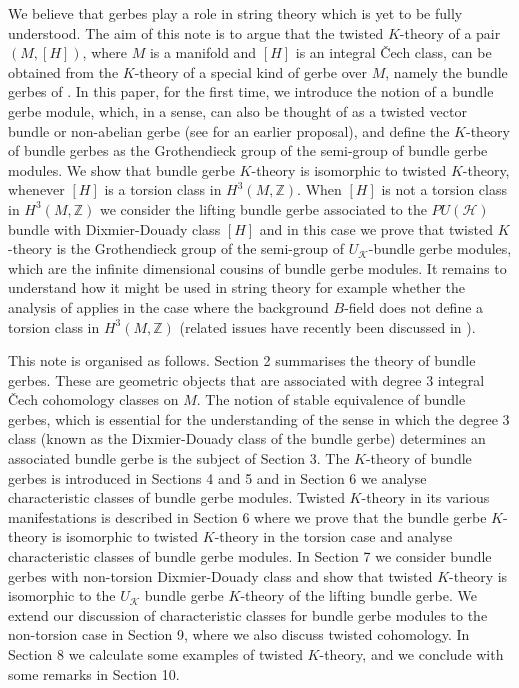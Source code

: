 \documentclass[a4paper,reqno]{amsart}
\theoremstyle{plain}
\theoremstyle{definition}
\theoremstyle{remark}
\numberwithin{equation}{section}
\numberwithin{figure}{section}
\newcommand{\cH}{{\mathcal H}}
\newcommand{\ZZ}{{\mathbb Z}}
\newcommand{\UK}{U{_\mathcal K}}
\newcommand{\<}{\langle}
\renewcommand{\>}{\rangle}
\begin{document}
We believe that gerbes play a role in string theory which is yet to be
fully understood. The aim of this note is to argue that the twisted
$K$-theory of a pair $(M,[H])$, where $M$ is a manifold and $[H]$ is
an integral \v Cech class, can be obtained from the
$K$-theory of a special kind of gerbe over $M$, namely the bundle
gerbes of \cite{Mur}.  In this paper, for the
first time, we introduce the notion of a bundle gerbe
module, which, in a sense, can also be thought of as a twisted
vector bundle or non-abelian gerbe (see \cite{Kalk} for an
earlier proposal), and define the $K$-theory of bundle gerbes as
the Grothendieck group of the semi-group of bundle gerbe modules.
We show that bundle gerbe $K$-theory is isomorphic
to twisted $K$-theory, whenever $[H]$ is a torsion class in $H^3(M,
\mathbb Z)$.
When $[H]$ is not a torsion class in $H^3(M, \mathbb Z)$ we consider the
lifting bundle gerbe associated to the $PU(\cH)$ bundle with Dixmier-Douady
class $[H]$ and in this case we prove
that twisted $K$-theory
is the Grothendieck group of the semi-group of  $\UK$-bundle gerbe modules,
which are the infinite dimensional cousins of bundle gerbe modules.
   It remains to understand how it might be used in string theory for
example whether the analysis of
\cite{FW} applies in the case where the background $B$-field does not
define a torsion class in
$H^3(M,\ZZ)$ (related issues have recently been discussed in 
\cite{MalMooSei}).

This note is organised as follows. Section 2 summarises the theory of
bundle gerbes. These are geometric objects that are associated with
degree 3 integral \v Cech cohomology classes on $M$. The notion of stable
equivalence of bundle gerbes, which is essential for the understanding
of the sense in which the degree 3 class (known as the Dixmier-Douady
class of the bundle gerbe) determines an associated bundle gerbe is
the subject of Section 3.  The $K$-theory of bundle gerbes is
introduced in Sections 4 and 5 and in Section 6 we analyse
characteristic classes of bundle gerbe modules.   
Twisted $K$-theory in its various
manifestations is described in Section 6 where we prove that the
bundle gerbe $K$-theory is isomorphic to twisted $K$-theory in the torsion
case and analyse characteristic classes of bundle gerbe modules.
In Section 7 we consider bundle gerbes with non-torsion
Dixmier-Douady class  and show that twisted $K$-theory  is isomorphic
to the  $\UK$ bundle gerbe $K$-theory
of the lifting bundle gerbe.
We extend our discussion of characteristic classes for bundle 
gerbe modules to the non-torsion case in Section 9, where 
we also discuss twisted cohomology.
In Section 8 we calculate some examples of twisted $K$-theory,
and we conclude with some remarks in Section 10.
\end{document}
